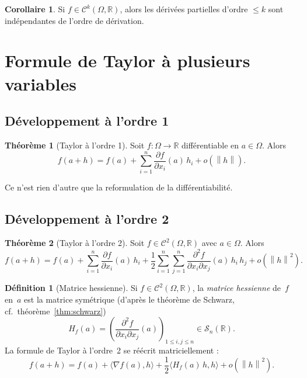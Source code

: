 \documentclass[12pt,a4paper,openany]{book}
\theoremstyle{definition}
\newtheorem{definition}{Définition}[chapter]
\newtheorem{theoreme}{Théorème}[chapter]
\newtheorem{corollaire}{Corollaire}[chapter]
\newcommand{\R}{\mathbb{R}}
\newcommand{\norm}[1]{\left\lVert #1 \right\rVert}
\begin{document}
\begin{corollaire}
  \label{cor:Ck-symetrie}
  Si $f \in \mathcal{C}^k(\Omega, \R)$, alors les dérivées partielles d'ordre $\leqslant k$ sont indépendantes de l'ordre de dérivation.
\end{corollaire}

\section{Formule de Taylor à plusieurs variables}
\label{sec:taylor-plusieurs-variables}

\subsection{Développement à l'ordre 1}

\begin{theoreme}[Taylor à l'ordre 1]
  \label{thm:taylor-ordre1}
  Soit $f \colon \Omega \to \R$ différentiable en $a \in \Omega$. Alors
  \[
    f(a + h) = f(a) + \sum_{i=1}^{n} \frac{\partial f}{\partial x_i}(a) \, h_i + o(\norm{h}).
  \]
\end{theoreme}

Ce n'est rien d'autre que la reformulation de la différentiabilité.

\subsection{Développement à l'ordre 2}

\begin{theoreme}[Taylor à l'ordre 2]
  \label{thm:taylor-ordre2}
  Soit $f \in \mathcal{C}^2(\Omega, \R)$ avec $a \in \Omega$. Alors
  \[
    f(a + h) = f(a) + \sum_{i=1}^{n} \frac{\partial f}{\partial x_i}(a) \, h_i
    + \frac{1}{2} \sum_{i=1}^{n} \sum_{j=1}^{n} \frac{\partial^2 f}{\partial x_i \partial x_j}(a) \, h_i \, h_j
    + o(\norm{h}^2).
  \]
\end{theoreme}

\begin{definition}[Matrice hessienne]\label{def:hessienne}
  Si $f \in \mathcal{C}^2(\Omega, \R)$, la \emph{matrice hessienne} de~$f$ en~$a$ est la matrice symétrique (d'après le théorème de Schwarz, cf.\ théorème~\ref{thm:schwarz})
  \[
    H_f(a) = \left(\frac{\partial^2 f}{\partial x_i \partial x_j}(a)\right)_{1 \leqslant i,j \leqslant n} \in \mathcal{S}_n(\R).
  \]
  La formule de Taylor à l'ordre~2 se réécrit matriciellement :
  \[
    f(a+h) = f(a) + \langle \nabla f(a), h \rangle + \frac{1}{2} \langle H_f(a) \, h, h \rangle + o(\norm{h}^2).
  \]
\end{definition}
\end{document}
